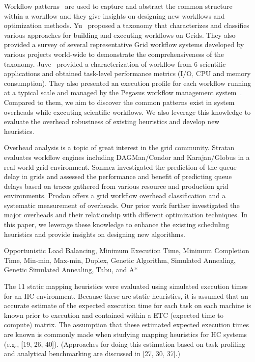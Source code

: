 \documentclass[final]{IEEEtran}
\begin{document}
Workflow patterns~\cite{Yu2005, Juve2013} are used to capture and abstract the common structure within a workflow and they give insights on designing new workflows and optimization methods.  
Yu~\cite{Yu2005} proposed a taxonomy that characterizes and classifies various approaches for building and executing workflows on Grids. They also provided a survey of several representative Grid workflow systems developed by various projects world-wide to demonstrate the comprehensiveness of the taxonomy. Juve~\cite{Juve2013} provided a characterization of workflow from 6 scientific applications and obtained task-level performance metrics (I/O, CPU and memory consumption). They also presented an execution profile for each workflow running at a typical scale and managed by the Pegasus workflow management system~\cite{Deelman2005}. Compared to them, we aim to discover the common patterns exist in system overheads while executing scientific workflows. We also leverage this knowledge to evaluate the overhead robustness of existing heuristics and develop new heuristics. 

Overhead analysis \cite{Prodan}\cite{Chen} is a topic of great interest in the grid community. Stratan \cite{Stratan} evaluates workflow engines including DAGMan/Condor and Karajan/Globus in a real-world grid environment. Sonmez \cite{Sonmez} investigated the prediction of the queue delay in grids and assessed the performance and benefit of predicting queue delays based on traces gathered from various resource and production grid environments. Prodan \cite{Prodan} offers a grid workflow overhead classification and a systematic measurement of overheads. Our prior work \cite{Chen} further investigated the major overheads and their relationship with different optimization techniques. In this paper, we leverage these knowledge to enhance the existing scheduling heuristics and provide insights on designing new algorithms. 

Opportunistic Load Balancing, Minimum Execution Time, Minimum Completion Time, Min-min, Max-min, Duplex, Genetic Algorithm, Simulated Annealing, Genetic Simulated Annealing, Tabu, and A*

The 11 static mapping heuristics were evaluated using simulated execution times for an HC environment. Because these are static heuristics, it is assumed that an accurate estimate of the expected execution time for each task on each machine is known prior to execution and contained within a  ETC (expected time to compute) matrix. The assumption that these estimated expected execution times are known is commonly made when studying mapping heuristics for HC systems (e.g., [19, 26, 40]). (Approaches for doing this estimation based on task profiling and analytical benchmarking are discussed in [27, 30, 37].)
\end{document}
